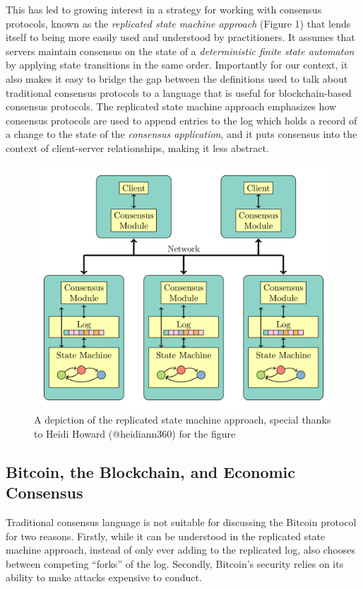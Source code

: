 \documentclass[11pt,a4paper]{article}
\theoremstyle{plain}
\theoremstyle{definition}
\begin{document}
This has led to growing interest in a strategy for working with consensus protocols, known as the \emph{replicated state machine approach} (Figure 1) that lends itself to being more easily used and understood by practitioners. It assumes that servers maintain consensus on the state of a \emph{deterministic finite state automaton} by applying state transitions in the same order. Importantly for our context, it also makes it easy to bridge the gap between the definitions used to talk about traditional consensus protocols to a language that is useful for blockchain-based consensus protocols. The replicated state machine approach emphasizes how consensus protocols are used to append entries to the log which holds a record of a change to the state of the \emph{consensus application}, and it puts consensus into the context of client-server relationships, making it less abstract.

\begin{figure}
\includegraphics{smr.png}
\caption{A depiction of the replicated state machine approach, special thanks to Heidi Howard (@heidiann360) for the figure}
\end{figure}


\subsection{Bitcoin, the Blockchain, and Economic Consensus}

Traditional consensus language is not suitable for discussing the Bitcoin protocol for two reasons. Firstly, while it can be understood in the replicated state machine approach, instead of only ever adding to the replicated log, also chooses between competing ``forks'' of the log. Secondly, Bitcoin's security relies on its ability to make attacks expensive to conduct. 
\end{document}
